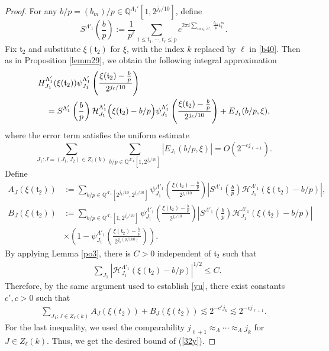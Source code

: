\documentclass[10pt,a4paper]{amsart}
\numberwithin{equation}{section}
\begin{document}
 
\begin{proof}
For any  $ b/p =(b_m)/p\in  \mathbb{Q}^{\Lambda_1'}[1,2^{j_\ell/10}]$, define $$S^{\Lambda'_1}(\frac{b}{p}):= \frac{1}{p^{\ell} }\sum_{1\le t_1,\cdots,t_\ell\le p}e^{2\pi i \sum_{m\in\Lambda'_{1}} \frac{b_{m}}{p} \mathfrak{t}_1^m}.$$ 
Fix $\mathfrak{t}_2$ and substitute $\xi(\mathfrak{t}_2)$ for $\xi$, with the index $k$ replaced by $\ell$ in \eqref{b40}.  Then as in  Proposition \ref{lemm29}, we obtain the following integral approximation  
\begin{align*}
&H^{\Lambda'_1}_{J_1}(\xi(\mathfrak{t}_2)) \psi^{\Lambda'_1}_{J_1}\left(\frac{\xi(\mathfrak{t}_2)-\frac{b}{p}}{2^{j_{\ell}/10}}\right)\\
&\quad=  S^{\Lambda'_1}\left(\frac{b}{p}\right)  \mathcal{H}^{\Lambda'_1}_{J_1}\Bigl(\xi(\mathfrak{t}_2)-b/p\Bigr)\psi^{\Lambda'_1}_{J_1}\left(\frac{\xi(\mathfrak{t}_2)-\frac{b}{p}}{2^{j_{\ell}/10}}\right)+ E_{J_1}(b/p,\xi),
\end{align*}
where   the error term satisfies the uniform estimate
\[
\sum_{J_1: J=(J_1,J_2)\in Z_\ell(k)}\sum_{b/p\in \mathbb{Q}^{\Lambda'_1}[1,2^{j_\ell/10}]}
   |E_{J_1}(b/p,\xi)|
   = O(2^{-c j_{\ell+1}}).
\]
Define
\begin{align*}
	A_J(\xi(\mathfrak{t}_2))&:=  \sum_{b/p\in  \mathbb{Q}^{\Lambda'_1}[2^{j_{k}/10},2^{j_{\ell}/10}]} \psi^{\Lambda'_1}_{J_1}\left(\frac{\xi(\mathfrak{t}_2)-\frac{b}{p}}{2^{j_{\ell}/10}}\right)\left|S^{\Lambda'_1}\left(\frac{b}{p}\right)\mathcal{H}^{\Lambda'_1}_{J_1}(\xi(\mathfrak{t}_2)-b/p)\right|,\\
 B_J(\xi(\mathfrak{t}_2))&:=  \sum_{b/p\in  \mathbb{Q}^{\Lambda'_1}[1,2^{j_k/10}]} \psi^{\Lambda'_1}_{J_1}\left(\frac{\xi(\mathfrak{t}_2)-\frac{b}{p}}{2^{j_{\ell}/10}}\right)\left|S^{\Lambda'_1}\left(\frac{b}{p}\right)\mathcal{H}^{\Lambda'_1}_{J_1}(\xi(\mathfrak{t}_2)-b/p)\right| \\
 &\times  \left(1- \psi^{\Lambda'_1}_{J_1}\left(\frac{\xi(\mathfrak{t}_2)-\frac{b}{p}}{2^{j_k(\rho/100)}}\right) \right).\end{align*} 
  By applying Lemma \ref{po3}, there is  $C>0$ independent of   $\mathfrak{t}_2 $ such that
 \begin{align*}
 	&\sum_{J_1 }|\mathcal{H}^{\Lambda'_1}_{J_1}(\xi(\mathfrak{t}_2)-b/p)|^{1/2}  \le C.
 \end{align*}
Therefore,   by the same argument used to establish \eqref{yu}, there exist constants $c',c>0$ such that
 \begin{align*}
 \sum_{J_1; J\in Z_\ell(k)}  A_J(\xi(t_2)) +  B_J(\xi(t_2)) 
 \lesssim 2^{-c' j_{k}}   \lesssim  2^{-c j_{\ell+1}}.
 \end{align*}
For the last inequality, we used the comparability
$
j_{\ell+1}\approx_\Lambda\cdots\approx_\Lambda j_k
$
for $J\in Z_\ell(k)$. Thus, we   get the desired bound of (\ref{32y}).
 \end{proof}
\end{document}
